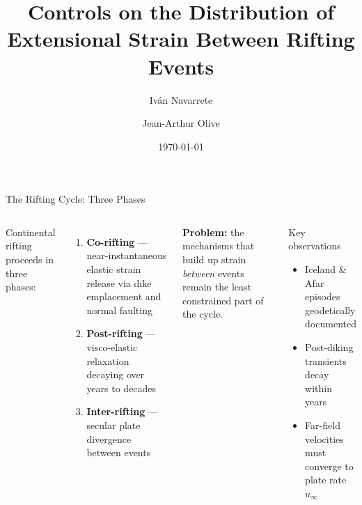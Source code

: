 \documentclass[aspectratio=169]{beamer}
\title[Inter-Rifting Strain]{Controls on the Distribution of\\
  Extensional Strain Between Rifting Events}
\author{Iván Navarrete \and Jean-Arthur Olive}
\date{\today}
\begin{document}
\begin{frame}
  \titlepage
\end{frame}

\begin{frame}{The Rifting Cycle: Three Phases}
  \begin{columns}
      Continental rifting proceeds in three phases:
      \begin{enumerate}
        \item \textbf{Co-rifting} --- near-instantaneous elastic strain release via
              dike emplacement and normal faulting
        \item \textbf{Post-rifting} --- visco-elastic relaxation decaying over years
              to decades
        \item \textbf{Inter-rifting} --- secular plate divergence between events
      \end{enumerate}
      \vspace{0.5em}
      \textbf{Problem:} the mechanisms that build up strain \emph{between} events
      remain the least constrained part of the cycle.

      \begin{block}{Key observations}
        \begin{itemize}
          \item Iceland \& Afar episodes geodetically documented
          \item Post-diking transients decay within years
          \item Far-field velocities must converge to plate rate $\dot{u}_\infty$
        \end{itemize}
      \end{block}
  \end{columns}
\end{frame}
\end{document}
